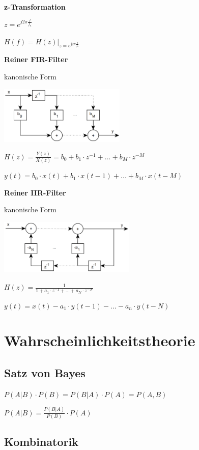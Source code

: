 \textbf{z-Transformation}

$\displaystyle{
    z = e^{j2\pi \frac{f}{f_a}}
}$

$\displaystyle{
    H(f) = H(z) \bigg \vert _{z=e^{j2\pi \frac{f}{f_a}}}
}$

\textbf{Reiner FIR-Filter}

kanonische Form

\includegraphics[width=6cm]{img/fir.png}

$\displaystyle{
    H(z) = \frac{Y(z)}{X(z)} = b_0 + b_1 \cdot z^{-1} + ... + b_M \cdot z^{-M}
}$

$\displaystyle{
    y(t) = b_0 \cdot x(t) + b_1 \cdot x(t-1) + ... + b_M \cdot x(t-M)
}$

\textbf{Reiner IIR-Filter}

kanonische Form

\includegraphics[width=6.5cm]{img/iir.png}

$\displaystyle{
    H(z) = \frac{1}{1 + a_1 \cdot z^{-1} + ... + a_N \cdot z^{-N}}
}$

$\displaystyle{
    y(t) = x(t) - a_1 \cdot y(t-1) - ... - a_n \cdot y(t-N)
}$

\section{Wahrscheinlichkeitstheorie}

\subsection{Satz von Bayes}

$\displaystyle{
    P(A|B) \cdot P(B) = P(B|A) \cdot P(A) = P(A,B)
}$

$\displaystyle{
    P(A|B) = \frac{P(B|A)}{P(B)} \cdot P(A)
}$

\subsection{Kombinatorik}


